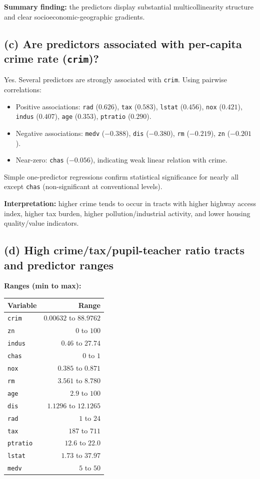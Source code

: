\documentclass[12pt]{article}
\begin{document}
\textbf{Summary finding:} the predictors display substantial multicollinearity structure and clear socioeconomic-geographic gradients.

\subsection*{(c) Are predictors associated with per-capita crime rate (\texttt{crim})?}
Yes. Several predictors are strongly associated with \texttt{crim}. Using pairwise correlations:
\begin{itemize}
\item Positive associations: \texttt{rad} ($0.626$), \texttt{tax} ($0.583$), \texttt{lstat} ($0.456$), \texttt{nox} ($0.421$), \texttt{indus} ($0.407$), \texttt{age} ($0.353$), \texttt{ptratio} ($0.290$).
\item Negative associations: \texttt{medv} ($-0.388$), \texttt{dis} ($-0.380$), \texttt{rm} ($-0.219$), \texttt{zn} ($-0.201$).
\item Near-zero: \texttt{chas} ($-0.056$), indicating weak linear relation with crime.
\end{itemize}

Simple one-predictor regressions confirm statistical significance for nearly all except \texttt{chas} (non-significant at conventional levels).

\textbf{Interpretation:} higher crime tends to occur in tracts with higher highway access index, higher tax burden, higher pollution/industrial activity, and lower housing quality/value indicators.

\subsection*{(d) High crime/tax/pupil-teacher ratio tracts and predictor ranges}
\textbf{Ranges (min to max):}
\begin{center}
\begin{tabular}{lr}
\toprule
Variable & Range \\
\midrule
\texttt{crim} & $0.00632$ to $88.9762$ \\
\texttt{zn} & $0$ to $100$ \\
\texttt{indus} & $0.46$ to $27.74$ \\
\texttt{chas} & $0$ to $1$ \\
\texttt{nox} & $0.385$ to $0.871$ \\
\texttt{rm} & $3.561$ to $8.780$ \\
\texttt{age} & $2.9$ to $100$ \\
\texttt{dis} & $1.1296$ to $12.1265$ \\
\texttt{rad} & $1$ to $24$ \\
\texttt{tax} & $187$ to $711$ \\
\texttt{ptratio} & $12.6$ to $22.0$ \\
\texttt{lstat} & $1.73$ to $37.97$ \\
\texttt{medv} & $5$ to $50$ \\
\bottomrule
\end{tabular}
\end{center}
\end{document}
